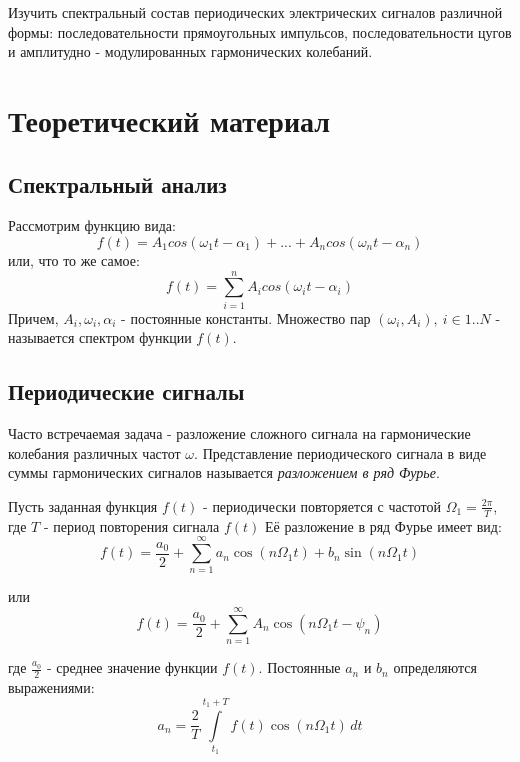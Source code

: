 \documentclass[a4paper, 12pt]{article}
\begin{document}
Изучить спектральный состав периодических электрических сигналов различной формы: последовательности прямоугольных импульсов, последовательности цугов и амплитудно - модулированных гармонических колебаний.

\section{Теоретический материал}

\subsection{Спектральный анализ}

Рассмотрим функцию вида:
$$f(t) = A_{1}cos(\omega_1t-\alpha_{1}) + ... + A_{n}cos(\omega_{n}t-\alpha_{n})$$
или, что то же самое:
$$f(t) = \sum\limits_{i=1}^n A_{i}cos(\omega_{i}t-\alpha_{i})$$
Причем, $A_{i}, \omega_{i}, \alpha_{i}$ - постоянные константы. Множество пар $(\omega_{i}, A_{i}), \: i \in 1..N$ - называется спектром функции $f(t)$.

\subsection{Периодические сигналы}

Часто встречаемая задача - разложение сложного сигнала на гармонические колебания различных частот $\omega$. Представление периодического сигнала в виде суммы гармонических сигналов называется {\it{разложением в ряд Фурье}}.

Пусть заданная функция $f(t)$ - периодически повторяется с частотой $\Omega_{1}=\frac{2\pi}{T}$, где $T$ - период повторения сигнала $f(t)$
Её разложение в ряд Фурье имеет вид:
\begin{equation}
\label{form:furie}	
	f(t)=\frac{a_{0}}{2}+\sum\limits_{n=1}^{\infty}a_{n}\cos(n\Omega_{1}t)+b_{n}\sin(n\Omega_{1}t) 
\end{equation}

или
\begin{equation}
	f(t)=\frac{a_{0}}{2}+\sum\limits_{n=1}^{\infty}A_{n}\cos(n\Omega_{1}t-\psi_{n}) 
\label{form:furie_2}
\end{equation}

где $\frac{a_{0}}{2}$ - среднее значение функции $f(t)$. Постоянные $a_n$ и $b_n$ определяются выражениями:
\begin{equation}
\label{form:a_n}
	a_{n} = \frac{2}{T}\int\limits_{t_{1}}^{t_{1}+T}f(t)\cos(n\Omega_1t)\, dt
\end{equation}
\end{document}
